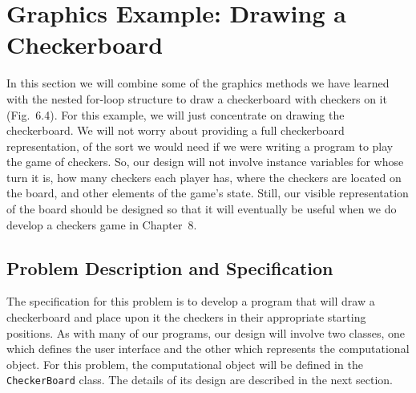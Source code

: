 \newpage
\section{Graphics Example: Drawing a Checkerboard}

In this section we will combine some of the graphics methods we have
learned with the nested for-loop structure to draw a checkerboard with
checkers on it (Fig.~6.4). For this example, we will just
concentrate on drawing the checkerboard.  We will not worry about
providing a full checkerboard representation, of the sort we would
need if we were writing a program to play the game of checkers. So,
our design will not involve instance
variables for whose turn it is, how many checkers each player has,
where the checkers are located on the board, and other elements of the
game's state. Still, our visible representation of the board should
be designed so that it will eventually be useful when we do develop a
checkers game in Chapter~8.

\subsection*{Problem Description and Specification}

The specification for this problem is to develop a program that will
draw a checkerboard and place upon it the checkers in their
appropriate starting positions.  As with many of our programs, our
design will involve two classes, one which defines the user interface
and the other which represents the computational object.  For this
problem, the computational object will be defined in the {\tt
CheckerBoard} class. The details of its design are described in the
next section.

